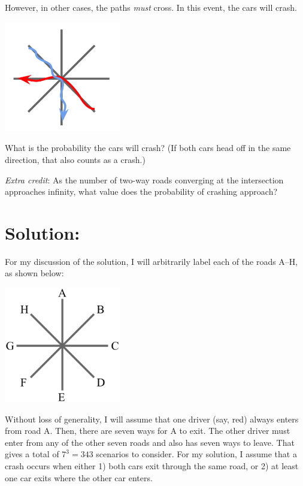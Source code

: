 \documentclass{article}
\begin{document}
However, in other cases, the paths \textit{must} cross.
In this event, the cars will crash.

\vspace{0.1in}
\begin{center}
\includegraphics[width=2in]{roads_3.png}
\end{center}
\vspace{0.1in}

What is the probability the cars will crash?
(If both cars head off in the same direction, that also counts as a crash.)

\textit{Extra credit}: As the number of two-way roads converging at the intersection approaches infinity, what value does the probability of crashing approach?



\section*{Solution:}

For my discussion of the solution, I will arbitrarily label each of the roads A--H, as shown below:

\vspace{0.1in}
\begin{center}
\includegraphics[width=2in]{roads_labeled.png}
\end{center}
\vspace{0.1in}

Without loss of generality, I will assume that one driver (say, red) always enters from road A.
Then, there are seven ways for A to exit.
The other driver must enter from any of the other seven roads and also has seven ways to leave.
That gives a total of $7^{3}=343$ scenarios to consider.
For my solution, I assume that a crash occurs when either 1) both cars exit through the same road, or 2) at least one car exits where the other car enters.
\end{document}
